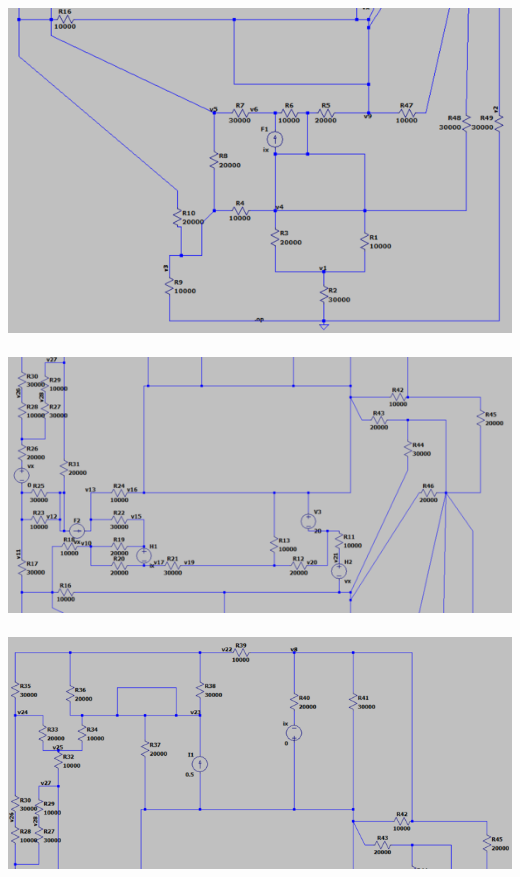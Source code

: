\documentclass{article}
\begin{document}
\includegraphics[]{images/ltspice1_75.PNG}\\ \\
\includegraphics[]{images/ltspice2_75.PNG}\\ \\
\includegraphics[]{images/ltspice3_70.PNG}\\ \\
\end{document}
